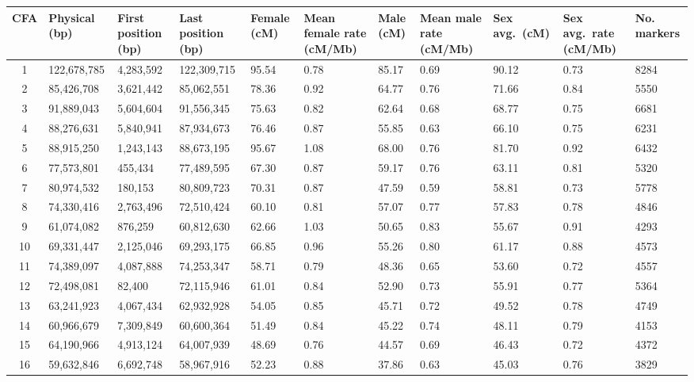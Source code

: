 \begin{table}[p] \centering
    \scriptsize
    \begin{tabular}{|c|p{1.3cm}|p{1.3cm}|p{1.2cm}|p{0.8cm}|p{0.8cm}|p{0.8cm}|p{0.8cm}|p{0.8cm}|p{0.8cm}|p{0.8cm}|}
        \hline CFA & Physical (bp) & First position (bp) & Last position (bp) & Female (cM) & Mean female rate (cM/Mb) & Male (cM) & Mean male rate (cM/Mb) & Sex avg.\ (cM) & Sex avg.\ rate (cM/Mb) & No. markers \\ \hline
1 & 122,678,785 & 4,283,592 & 122,309,715 & 95.54 & 0.78 & 85.17 & 0.69 & 90.12 & 0.73 & 8284 \\
2 & 85,426,708 & 3,621,442 & 85,062,551 & 78.36 & 0.92 & 64.77 & 0.76 & 71.66 & 0.84 & 5550 \\
3 & 91,889,043 & 5,604,604 & 91,556,345 & 75.63 & 0.82 & 62.64 & 0.68 & 68.77 & 0.75 & 6681 \\
4 & 88,276,631 & 5,840,941 & 87,934,673 & 76.46 & 0.87 & 55.85 & 0.63 & 66.10 & 0.75 & 6231 \\
5 & 88,915,250 & 1,243,143 & 88,673,195 & 95.67 & 1.08 & 68.00 & 0.76 & 81.70 & 0.92 & 6432 \\
6 & 77,573,801 & 455,434 & 77,489,595 & 67.30 & 0.87 & 59.17 & 0.76 & 63.11 & 0.81 & 5320 \\
7 & 80,974,532 & 180,153 & 80,809,723 & 70.31 & 0.87 & 47.59 & 0.59 & 58.81 & 0.73 & 5778 \\
8 & 74,330,416 & 2,763,496 & 72,510,424 & 60.10 & 0.81 & 57.07 & 0.77 & 57.83 & 0.78 & 4846 \\
9 & 61,074,082 & 876,259 & 60,812,630 & 62.66 & 1.03 & 50.65 & 0.83 & 55.67 & 0.91 & 4293 \\
10 & 69,331,447 & 2,125,046 & 69,293,175 & 66.85 & 0.96 & 55.26 & 0.80 & 61.17 & 0.88 & 4573 \\
11 & 74,389,097 & 4,087,888 & 74,253,347 & 58.71 & 0.79 & 48.36 & 0.65 & 53.60 & 0.72 & 4557 \\
12 & 72,498,081 & 82,400 & 72,115,946 & 61.01 & 0.84 & 52.90 & 0.73 & 55.91 & 0.77 & 5364 \\
13 & 63,241,923 & 4,067,434 & 62,932,928 & 54.05 & 0.85 & 45.71 & 0.72 & 49.52 & 0.78 & 4749 \\
14 & 60,966,679 & 7,309,849 & 60,600,364 & 51.49 & 0.84 & 45.22 & 0.74 & 48.11 & 0.79 & 4153 \\
15 & 64,190,966 & 4,913,124 & 64,007,939 & 48.69 & 0.76 & 44.57 & 0.69 & 46.43 & 0.72 & 4372 \\
16 & 59,632,846 & 6,692,748 & 58,967,916 & 52.23 & 0.88 & 37.86 & 0.63 & 45.03 & 0.76 & 3829 \\

\end{tabular}
\end{table}
